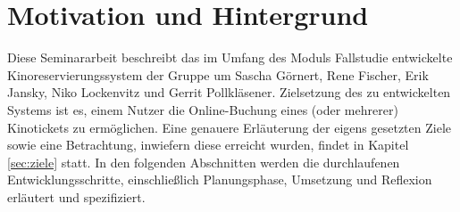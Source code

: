 \section{Motivation und Hintergrund}

Diese Seminararbeit beschreibt das im Umfang des Moduls Fallstudie entwickelte Kinoreservierungssystem der Gruppe um Sascha Görnert, Rene Fischer, Erik Jansky, Niko Lockenvitz und Gerrit Pollkläsener.
Zielsetzung des zu entwickelten Systems ist es, einem Nutzer die Online-Buchung eines (oder mehrerer) Kinotickets zu ermöglichen.
Eine genauere Erläuterung der eigens gesetzten Ziele sowie eine Betrachtung, inwiefern diese erreicht wurden, findet in Kapitel \vref{sec:ziele} statt.
In den folgenden Abschnitten werden die durchlaufenen Entwicklungsschritte, einschließlich Planungsphase, Umsetzung und Reflexion erläutert und spezifiziert.